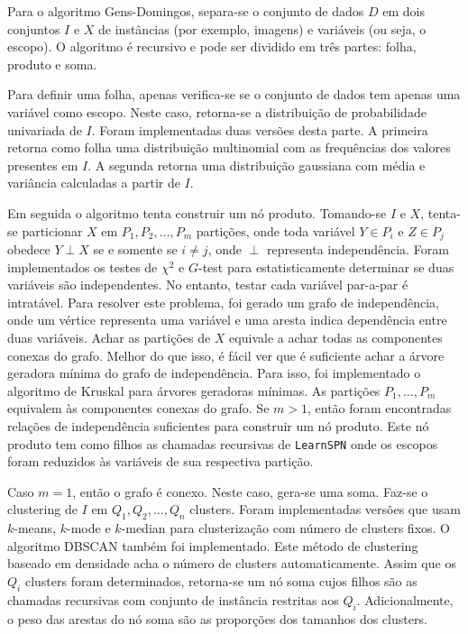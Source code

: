 \documentclass[12pt]{article}
\theoremstyle{plain}
\numberwithin{equation}{section}
\newcommand{\indep}{\perp}
\newcommand{\code}[1]{\lstinline[mathescape=true]{#1}}
\begin{document}
Para o algoritmo Gens-Domingos, separa-se o conjunto de dados $D$ em dois conjuntos $I$ e $X$ de
instâncias (por exemplo, imagens) e variáveis (ou seja, o escopo). O algoritmo é recursivo e pode
ser dividido em três partes: folha, produto e soma.

Para definir uma folha, apenas verifica-se se o conjunto de dados tem apenas uma variável como
escopo. Neste caso, retorna-se a distribuição de probabilidade univariada de $I$. Foram
implementadas duas versões desta parte. A primeira retorna como folha uma distribuição multinomial
com as frequências dos valores presentes em $I$. A segunda retorna uma distribuição gaussiana com
média e variância calculadas a partir de $I$.

Em seguida o algoritmo tenta construir um nó produto. Tomando-se $I$ e $X$, tenta-se particionar
$X$ em $P_1,P_2,\ldots,P_m$ partições, onde toda variável $Y\in P_i$ e $Z\in P_j$ obedece $Y\indep
X$ se e somente se $i\neq j$, onde $\indep$ representa independência. Foram implementados os testes
de $\chi^2$ e $G$-test para estatisticamente determinar se duas variáveis são independentes. No
entanto, testar cada variável par-a-par é intratável. Para resolver este problema, foi gerado um
grafo de independência, onde um vértice representa uma variável e uma aresta indica dependência
entre duas variáveis. Achar as partições de $X$ equivale a achar todas as componentes conexas do
grafo. Melhor do que isso, é fácil ver que é suficiente achar a árvore geradora mínima do grafo de
independência. Para isso, foi implementado o algoritmo de Kruskal para árvores geradoras mínimas.
As partições $P_1,\ldots,P_m$ equivalem às componentes conexas do grafo. Se $m>1$, então foram
encontradas relações de independência suficientes para construir um nó produto. Este nó produto tem
como filhos as chamadas recursivas de \code{LearnSPN} onde os escopos foram reduzidos às variáveis
de sua respectiva partição.

Caso $m=1$, então o grafo é conexo. Neste caso, gera-se uma soma. Faz-se o clustering de $I$ em
$Q_1,Q_2,\ldots,Q_n$ clusters. Foram implementadas versões que usam $k$-means, $k$-mode e
$k$-median para clusterização com número de clusters fixos. O algoritmo DBSCAN também foi
implementado. Este método de clustering baseado em densidade acha o número de clusters
automaticamente. Assim que os $Q_i$ clusters foram determinados, retorna-se um nó soma cujos filhos
são as chamadas recursivas com conjunto de instância restritas aos $Q_i$. Adicionalmente, o peso
das arestas do nó soma são as proporções dos tamanhos dos clusters.
\end{document}

